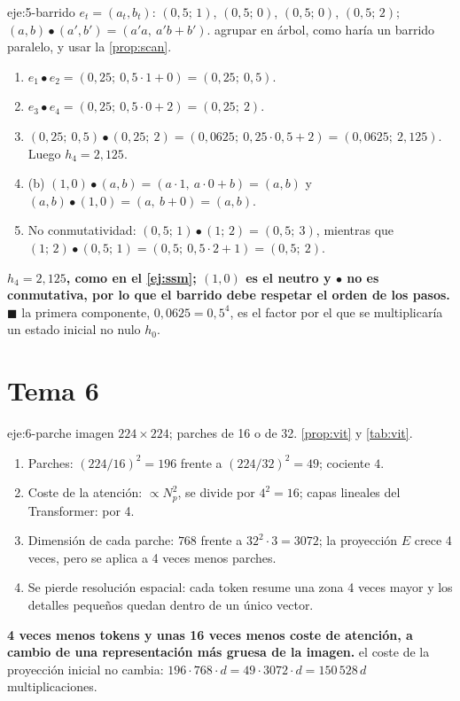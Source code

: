\begin{solucion}{eje:5-barrido}
\datos $e_t=(a_t,b_t)$: $(0{,}5;\,1)$, $(0{,}5;\,0)$, $(0{,}5;\,0)$, $(0{,}5;\,2)$; $(a,b)\bullet(a',b')=(a'a,\ a'b+b')$.
\planteamiento agrupar en árbol, como haría un barrido paralelo, y usar la \cref{prop:scan}.
\pasos
\begin{enumerate}[label=\arabic*.]
  \item $e_1\bullet e_2=(0{,}25;\ 0{,}5\cdot 1+0)=(0{,}25;\ 0{,}5)$.
  \item $e_3\bullet e_4=(0{,}25;\ 0{,}5\cdot 0+2)=(0{,}25;\ 2)$.
  \item $(0{,}25;\ 0{,}5)\bullet(0{,}25;\ 2)=(0{,}0625;\ 0{,}25\cdot 0{,}5+2)=(0{,}0625;\ 2{,}125)$. Luego $h_4=2{,}125$.
  \item (b) $(1,0)\bullet(a,b)=(a\cdot 1,\ a\cdot 0+b)=(a,b)$ y $(a,b)\bullet(1,0)=(a,\ b+0)=(a,b)$.
  \item No conmutatividad: $(0{,}5;\,1)\bullet(1;\,2)=(0{,}5;\ 3)$, mientras que $(1;\,2)\bullet(0{,}5;\,1)=(0{,}5;\ 0{,}5\cdot 2+1)=(0{,}5;\ 2)$.
\end{enumerate}
\resultado \textbf{$h_4=2{,}125$, como en el \cref{ej:ssm}; $(1,0)$ es el neutro y $\bullet$ no es conmutativa, por lo que el barrido debe respetar el orden de los pasos.} $\blacksquare$
\comprobacion la primera componente, $0{,}0625=0{,}5^{4}$, es el factor por el que se multiplicaría un estado inicial no nulo $h_0$.
\end{solucion}

\section{Tema 6}

\begin{solucion}{eje:6-parche}
\datos imagen $224\times 224$; parches de 16 o de 32.
\planteamiento \cref{prop:vit} y \cref{tab:vit}.
\pasos
\begin{enumerate}[label=\arabic*.]
  \item Parches: $(224/16)^{2}=196$ frente a $(224/32)^{2}=49$; cociente $4$.
  \item Coste de la atención: $\propto N_p^{2}$, se divide por $4^{2}=16$; capas lineales del Transformer: por 4.
  \item Dimensión de cada parche: $768$ frente a $32^{2}\cdot 3=3072$; la proyección $E$ crece 4 veces, pero se aplica a 4 veces menos parches.
  \item Se pierde resolución espacial: cada token resume una zona 4 veces mayor y los detalles pequeños quedan dentro de un único vector.
\end{enumerate}
\resultado \textbf{4 veces menos tokens y unas 16 veces menos coste de atención, a cambio de una representación más gruesa de la imagen.}
\comprobacion el coste de la proyección inicial no cambia: $196\cdot 768\cdot d=49\cdot 3072\cdot d=150\,528\,d$ multiplicaciones.
\end{solucion}

